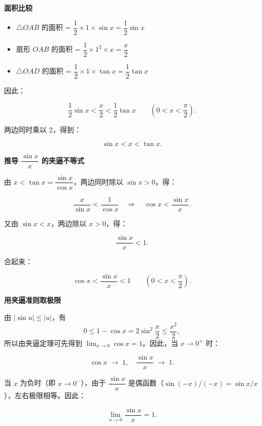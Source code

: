 \documentclass[fontset=fandol]{ctexart}
\newenvironment{custom}[1]{\par\noindent\textbf{#1}\quad}{\par\vspace{0.8em}}
\begin{document}
\begin{custom}{面积比较}

\begin{itemize}
\item \(\triangle OAB\) 的面积 = \(\dfrac{1}{2} \times 1 \times \sin x = \dfrac{1}{2} \sin x\)
\item 扇形 \(OAB\) 的面积 = \(\dfrac{1}{2} \times 1^2 \times x = \dfrac{x}{2}\)
\item \(\triangle OAD\) 的面积 = \(\dfrac{1}{2} \times 1 \times \tan x = \dfrac{1}{2} \tan x\)
\end{itemize}

因此：

\[
\dfrac{1}{2} \sin x  <  \dfrac{x}{2} < \dfrac{1}{2} \tan x \qquad (0 < x < \dfrac{\pi}{2}).
\]

两边同时乘以 2，得到：

\[
\sin x  < x < \tan x.
\]

\end{custom}

\begin{custom}{推导 \(\dfrac{\sin x}{x}\) 的夹逼不等式}

由 \(x < \tan x = \dfrac{\sin x}{\cos x}\)，两边同时除以 \(\sin x > 0\)，得：

\[
\dfrac{x}{\sin x} < \dfrac{1}{\cos x} \quad \Longrightarrow \quad \cos x < \dfrac{\sin x}{x}.
\]

又由 \(\sin x < x\)，两边除以 \(x > 0\)，得：

\[
\dfrac{\sin x}{x} < 1.
\]

合起来：

\[
\cos x < \dfrac{\sin x}{x} < 1 \qquad (0 < x < \dfrac{\pi}{2}).
\]

\end{custom}

\begin{custom}{用夹逼准则取极限}

由 \(|\sin u|\leq|u|\)，有
\[
0\leq1-\cos x=2\sin^2\frac x2\leq\frac{x^2}{2},
\]
所以由夹逼定理可先得到 \(\lim_{x\to0}\cos x=1\)。因此，当 \(x \to 0^+\) 时：

\[
\cos x \;\longrightarrow\; 1,\quad \dfrac{\sin x}{x} \;\longrightarrow\; 1.
\]

当 \(x\) 为负时（即 \(x \to 0^-\)），由于 \(\dfrac{\sin x}{x}\) 是偶函数（\(\sin(-x)/(-x) = \sin x / x\)），左右极限相等。因此：

\[
\lim_{x \to 0} \dfrac{\sin x}{x} = 1.
\]

\end{custom}
\end{document}
